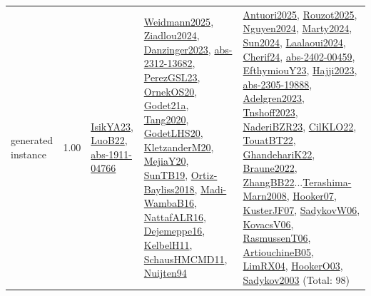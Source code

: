 {\begin{longtable}{p{3cm}r>{\raggedright\arraybackslash}p{6cm}>{\raggedright\arraybackslash}p{6cm}>{\raggedright\arraybackslash}p{8cm}}
\index{generated instance}\index{Benchmarks!generated instance}generated instance &  1.00 & \hyperref[detail:IsikYA23]{IsikYA23}, \hyperref[detail:LuoB22]{LuoB22}, \hyperref[detail:abs-1911-04766]{abs-1911-04766} & \hyperref[detail:Weidmann2025]{Weidmann2025}, \hyperref[detail:Ziadlou2024]{Ziadlou2024}, \hyperref[detail:Danzinger2023]{Danzinger2023}, \hyperref[detail:abs-2312-13682]{abs-2312-13682}, \hyperref[detail:PerezGSL23]{PerezGSL23}, \hyperref[detail:OrnekOS20]{OrnekOS20}, \hyperref[detail:Godet21a]{Godet21a}, \hyperref[detail:Tang2020]{Tang2020}, \hyperref[detail:GodetLHS20]{GodetLHS20}, \hyperref[detail:KletzanderM20]{KletzanderM20}, \hyperref[detail:MejiaY20]{MejiaY20}, \hyperref[detail:SunTB19]{SunTB19}, \hyperref[detail:Ortiz-Bayliss2018]{Ortiz-Bayliss2018}, \hyperref[detail:Madi-WambaB16]{Madi-WambaB16}, \hyperref[detail:NattafALR16]{NattafALR16}, \hyperref[detail:Dejemeppe16]{Dejemeppe16}, \hyperref[detail:KelbelH11]{KelbelH11}, \hyperref[detail:SchausHMCMD11]{SchausHMCMD11}, \hyperref[detail:Nuijten94]{Nuijten94} & \hyperref[detail:Antuori2025]{Antuori2025}, \hyperref[detail:Rouzot2025]{Rouzot2025}, \hyperref[detail:Nguyen2024]{Nguyen2024}, \hyperref[detail:Marty2024]{Marty2024}, \hyperref[detail:Sun2024]{Sun2024}, \hyperref[detail:Laalaoui2024]{Laalaoui2024}, \hyperref[detail:Cherif24]{Cherif24}, \hyperref[detail:abs-2402-00459]{abs-2402-00459}, \hyperref[detail:EfthymiouY23]{EfthymiouY23}, \hyperref[detail:Hajji2023]{Hajji2023}, \hyperref[detail:abs-2305-19888]{abs-2305-19888}, \hyperref[detail:Adelgren2023]{Adelgren2023}, \hyperref[detail:Tnshoff2023]{Tnshoff2023}, \hyperref[detail:NaderiBZR23]{NaderiBZR23}, \hyperref[detail:CilKLO22]{CilKLO22}, \hyperref[detail:TouatBT22]{TouatBT22}, \hyperref[detail:GhandehariK22]{GhandehariK22}, \hyperref[detail:Braune2022]{Braune2022}, \hyperref[detail:ZhangBB22]{ZhangBB22}...\hyperref[detail:Terashima-Marn2008]{Terashima-Marn2008}, \hyperref[detail:Hooker07]{Hooker07}, \hyperref[detail:KusterJF07]{KusterJF07}, \hyperref[detail:SadykovW06]{SadykovW06}, \hyperref[detail:KovacsV06]{KovacsV06}, \hyperref[detail:RasmussenT06]{RasmussenT06}, \hyperref[detail:ArtiouchineB05]{ArtiouchineB05}, \hyperref[detail:LimRX04]{LimRX04}, \hyperref[detail:HookerO03]{HookerO03}, \hyperref[detail:Sadykov2003]{Sadykov2003} (Total: 98)\\

\end{longtable}}
